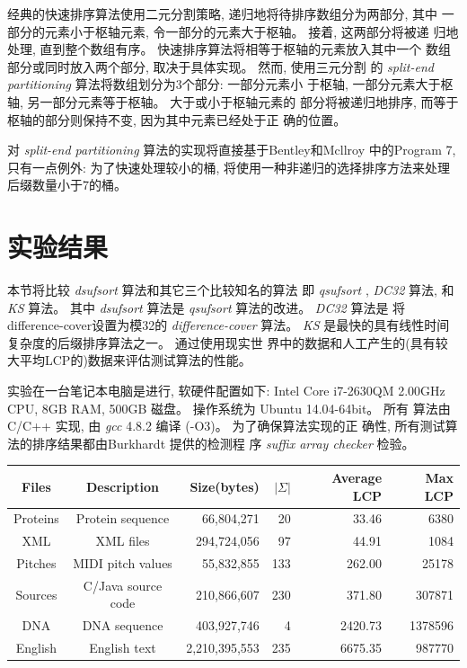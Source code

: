 经典的快速排序算法使用二元分割策略, 递归地将待排序数组分为两部分, 其中
一部分的元素小于枢轴元素, 令一部分的元素大于枢轴。 接着, 这两部分将被递
归地处理, 直到整个数组有序。 快速排序算法将相等于枢轴的元素放入其中一个
数组部分或同时放入两个部分, 取决于具体实现。 然而, 使用三元分割
的 \emph{split-end partitioning} 算法将数组划分为3个部分: 一部分元素小
于枢轴, 一部分元素大于枢轴, 另一部分元素等于枢轴。 大于或小于枢轴元素的
部分将被递归地排序, 而等于枢轴的部分则保持不变, 因为其中元素已经处于正
确的位置。

对 \emph{split-end partitioning} 算法的实现将直接基于Bentley和Mcllroy
\cite{Bentley1993} 中的Program 7, 只有一点例外: 为了快速处理较小的桶,
将使用一种非递归的选择排序方法来处理后缀数量小于7的桶。

\section{实验结果}
\label{sec:3_Experiment}

本节将比较 \emph{dsufsort} 算法和其它三个比较知名的算法
即 \emph{qsufsort} \cite{Larsson2007},
\emph{DC32}\cite{Burkhardt2003} 算法, 和 \emph{KS} 算法\cite{Karkkainen2006}。 其中
\emph{dsufsort} 算法是 \emph{qsufsort} 算法的改进。 \emph{DC32} 算法是
将 difference-cover设置为模32的 \emph{difference-cover} 算法。
\emph{KS} 是最快的具有线性时间复杂度的后缀排序算法之一。 通过使用现实世
界中的数据和人工产生的(具有较大平均LCP的)数据来评估测试算法的性能。

实验在一台笔记本电脑是进行, 软硬件配置如下: Intel Core i7-2630QM
2.00GHz CPU, 8GB RAM, 500GB 磁盘。 操作系统为 Ubuntu 14.04-64bit。  所有
算法由 C/C++ 实现, 由 \emph{gcc} 4.8.2 编译 (-O3)。 为了确保算法实现的正
确性, 所有测试算法的排序结果都由Burkhardt \cite{Burkhardt2003} 提供的检测程
序 \emph{suffix array checker} 检验。

\begin{table}[!htbp]
\begin{tabular}{ccrrrr} \hline Files & Description & Size(bytes) &
  $|\Sigma|$ & Average LCP & Max LCP \\ \hline
  Proteins & Protein sequence & 66,804,271 & 20 & 33.46 & 6380\\
  XML & XML files & 294,724,056 & 97 & 44.91 & 1084 \\
  Pitches & MIDI pitch values & 55,832,855 & 133 & 262.00 & 25178\\
  Sources & C/Java source code & 210,866,607 & 230 & 371.80 & 307871\\
  DNA & DNA sequence & 403,927,746 & 4 & 2420.73 & 1378596\\
  English & English text & 2,210,395,553 & 235 &6675.35 & 987770\\
  \hline
  \end{tabular}
  \label{tab:data}
\end{table}

